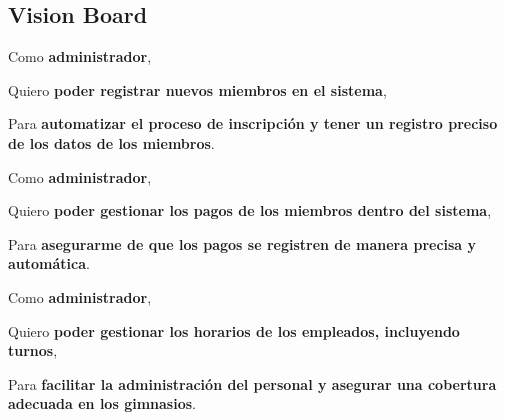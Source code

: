 \documentclass[spanish, 12pt]{article}
\begin{document}
	\subsection{Vision Board}
	\label{vision-board}
	\noindent
	\begin{minipage}{0.498\linewidth}
		\noindent
		\begin{PostItNote}
			[Width=0.9\linewidth,Corner=true,Pin=None,Color=html2,Rotate=2.1 ,Title={ Registro de Miembros},FontTitle={\bfseries\itshape}
			] Como \textbf{administrador},

			Quiero \textbf{poder registrar nuevos miembros en el sistema},

			Para \textbf{automatizar el proceso de inscripción y tener un registro
			preciso de los datos de los miembros}.
		\end{PostItNote}
		\vspace{0.5cm}
	\end{minipage}
	\noindent
	\begin{minipage}{0.498\linewidth}
		\noindent
		\begin{PostItNote}
			[Width=0.9\linewidth,Corner=true,Pin=None,Color=html3,Rotate=0.9 ,Title={ Gestión de Pagos},FontTitle={\bfseries\itshape}
			] Como \textbf{administrador},

			Quiero \textbf{poder gestionar los pagos de los miembros dentro del
			sistema},

			Para \textbf{asegurarme de que los pagos se registren de manera precisa y
			automática}.
		\end{PostItNote}
		\vspace{0.5cm}
	\end{minipage}
	\noindent
	\begin{minipage}{0.498\linewidth}
		\noindent
		\begin{PostItNote}
			[Width=0.9\linewidth,Corner=true,Pin=None,Color=html4,Rotate=-0.7 ,Title={ Gestión de Empleados y Horarios},FontTitle={\bfseries\itshape}
			] Como \textbf{administrador},

			Quiero \textbf{poder gestionar los horarios de los empleados, incluyendo turnos},

			Para \textbf{facilitar la administración del personal y asegurar una
			cobertura adecuada en los gimnasios}.
		\end{PostItNote}
		\vspace{0.5cm}
	\end{minipage}
\end{document}
